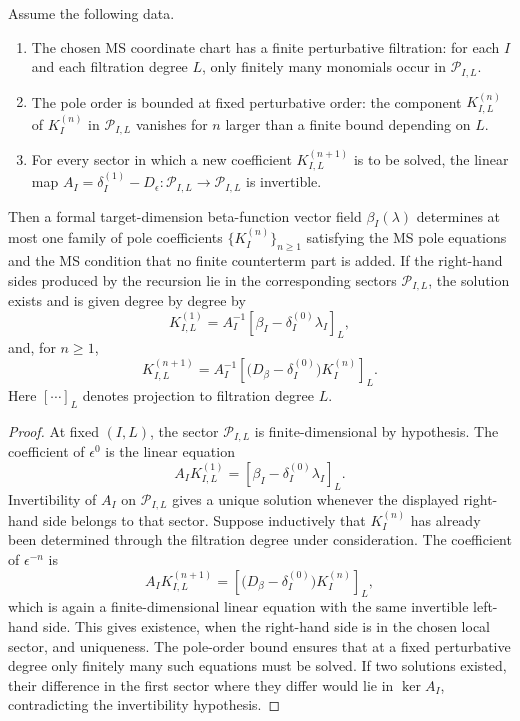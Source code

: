 \begin{lemma}
\label{lem:ms-pole-recursion-existence-uniqueness}
Assume the following data.
\begin{enumerate}[label=(\roman*)]
\item The chosen MS coordinate chart has a finite perturbative filtration:
  for each \(I\) and each filtration degree \(L\), only finitely many monomials
  occur in \(\mathcal P_{I,L}\).
\item The pole order is bounded at fixed perturbative order: the component
  \(K_{I,L}^{(n)}\) of \(K_I^{(n)}\) in \(\mathcal P_{I,L}\) vanishes for
  \(n\) larger than a finite bound depending on \(L\).
\item For every sector in which a new coefficient \(K_{I,L}^{(n+1)}\) is to be
  solved, the linear map
  \(A_I=\delta_I^{(1)}-D_\epsilon:\mathcal P_{I,L}\to\mathcal P_{I,L}\) is
  invertible.
\end{enumerate}
Then a formal target-dimension beta-function vector field
\(\beta_I(\lambda)\) determines at most one family of pole coefficients
\(\{K_I^{(n)}\}_{n\ge1}\) satisfying the MS pole equations and the MS condition
that no finite counterterm part is added.  If the right-hand sides produced by
the recursion lie in the corresponding sectors \(\mathcal P_{I,L}\), the
solution exists and is given degree by degree by
\[
  K_{I,L}^{(1)}
  =
  A_I^{-1}
  \left[
    \beta_I-\delta_I^{(0)}\lambda_I
  \right]_L,
\]
and, for \(n\ge1\),
\[
  K_{I,L}^{(n+1)}
  =
  A_I^{-1}
  \left[
    \bigl(D_\beta-\delta_I^{(0)}\bigr)K_I^{(n)}
  \right]_L .
\]
Here \([\cdots]_L\) denotes projection to filtration degree \(L\).
\end{lemma}

\begin{proof}
At fixed \((I,L)\), the sector \(\mathcal P_{I,L}\) is finite-dimensional by
hypothesis.  The coefficient of \(\epsilon^0\) is the linear equation
\[
  A_I K_{I,L}^{(1)}
  =
  [\beta_I-\delta_I^{(0)}\lambda_I]_L .
\]
Invertibility of \(A_I\) on \(\mathcal P_{I,L}\) gives a unique solution
whenever the displayed right-hand side belongs to that sector.  Suppose
inductively that \(K_I^{(n)}\) has already been determined through the
filtration degree under consideration.  The coefficient of \(\epsilon^{-n}\)
is
\[
  A_I K_{I,L}^{(n+1)}
  =
  \left[
    \bigl(D_\beta-\delta_I^{(0)}\bigr)K_I^{(n)}
  \right]_L ,
\]
which is again a finite-dimensional linear equation with the same invertible
left-hand side.  This gives existence, when the right-hand side is in the
chosen local sector, and uniqueness.  The pole-order bound ensures that at a
fixed perturbative degree only finitely many such equations must be solved.
If two solutions existed, their difference in the first sector where they
differ would lie in \(\ker A_I\), contradicting the invertibility hypothesis.
\end{proof}

